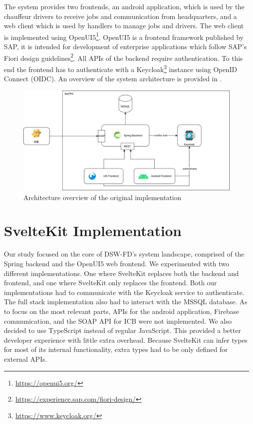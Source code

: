 The system provides two frontends, an android application, which is used by the chauffeur drivers to receive jobs and communication from headquarters, and a web client which is used by handlers to manage jobs and drivers. The web client is implemented using OpenUI5\footnote{\url{https://openui5.org/}}. OpenUI5 is a frontend framework published by SAP, it is intended for development of enterprise applications which follow SAP's Fiori design guidelines\footnote{\url{https://experience.sap.com/fiori-design/}}. All APIs of the backend require authentication. To this end the frontend has to authenticate with a Keycloak\footnote{\url{https://www.keycloak.org/}} instance using OpenID Connect (OIDC). An overview of the system architecture is provided in .

\begin{figure}[ht]
    \centering
    \includegraphics[width=.8\linewidth]{assets/dswfd-architecture}
    \caption{Architecture overview of the original implementation}
    \label{fig:dswfd-architecture}
\end{figure}

\section{SvelteKit Implementation}
Our study focused on the core of DSW-FD's system landscape, comprised of the Spring backend and the OpenUI5 web frontend. We experimented with two different implementations. One where SvelteKit replaces both the backend and frontend, and one where SvelteKit only replaces the frontend. Both our implementations had to communicate with the Keycloak service to authenticate. The full stack implementation also had to interact with the MSSQL database. As to focus on the most relevant parts, APIs for the android application, Firebase communication, and the SOAP API for ICB were not implemented. We also decided to use TypeScript instead of regular JavaScript. This provided a better developer experience with little extra overhead. Because SvelteKit can infer types for most of its internal functionality, extra types had to be only defined for external APIs.

